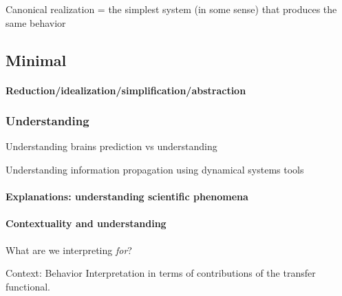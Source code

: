 \documentclass{article}
\theoremstyle{definition} \newtheorem{definition}{Definition}  \newtheorem{example}{Example}
\theoremstyle{remark} \newtheorem{remark}{Remark}
\newcounter{ct}
\begin{document}
Canonical realization = the simplest system (in some sense) that produces the same behavior

\subsection{Minimal}
\citep{beer1996toward}
\citep{chirimuuta2014minimal}
\citep{batterman2014minimal}
\citep{brancazio2023minimal}

\citep{Jordan2019a}

\paragraph{Reduction/idealization/simplification/abstraction}
\citep{marr1976computation, marr2010vision}

\citep{chirimuuta2018mmm} %

\citep{potochnik2021levels,
potochnik2020idealization,
potochnik2017idealization}

\citep{stinson2020idealized}
\citep{chirimuuta2024brain} 

\subsubsection{Understanding}
\citep{deregt2017understanding}
\citep{potochnik2017idealization}
\citep{guest2023logical}

Understanding brains \citep{marder2015understanding} \citep{lindsay2023testing} \citep{barman2024towards} \citep{dowling2018understanding}
prediction vs understanding \citep{chirimuuta2021prediction}

Understanding information propagation using dynamical systems tools \citep{vogt2022lyapunov}

\paragraph{Explanations: understanding scientific phenomena}
\citep{parascandolo2021learning}

\paragraph{Contextuality and understanding}
What are we interpreting \emph{for}?

Context: Behavior %
Interpretation in terms of contributions of the transfer functional.
\end{document}
